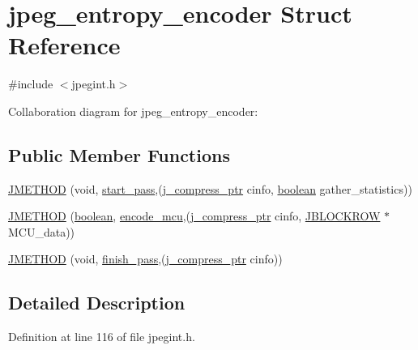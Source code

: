 \hypertarget{structjpeg__entropy__encoder}{}\section{jpeg\+\_\+entropy\+\_\+encoder Struct Reference}
\label{structjpeg__entropy__encoder}


{\ttfamily \#include $<$jpegint.\+h$>$}



Collaboration diagram for jpeg\+\_\+entropy\+\_\+encoder\+:
\subsection*{Public Member Functions}
\begin{DoxyCompactItemize}
\item 
\mbox{\hyperlink{structjpeg__entropy__encoder_aa42cc97f950746e53857b958e00519dd}{J\+M\+E\+T\+H\+OD}} (void, \mbox{\hyperlink{jddctmgr_8c_a1964f006adb8fb80f57e455f6452aec1}{start\+\_\+pass}},(\mbox{\hyperlink{jpeglib_8h_add2a072c54e3a51550f4975f7ddb91e7}{j\+\_\+compress\+\_\+ptr}} cinfo, \mbox{\hyperlink{jmorecfg_8h_a7c6368b321bd9acd0149b030bb8275ed}{boolean}} gather\+\_\+statistics))
\item 
\mbox{\hyperlink{structjpeg__entropy__encoder_a6852c01b9a63cceaae5f1d0e4ef1185a}{J\+M\+E\+T\+H\+OD}} (\mbox{\hyperlink{jmorecfg_8h_a7c6368b321bd9acd0149b030bb8275ed}{boolean}}, \mbox{\hyperlink{jcarith_8c_a72e97499e846635676b53db9977b4a5a}{encode\+\_\+mcu}},(\mbox{\hyperlink{jpeglib_8h_add2a072c54e3a51550f4975f7ddb91e7}{j\+\_\+compress\+\_\+ptr}} cinfo, \mbox{\hyperlink{jpeglib_8h_a04dea0959d9bd9e8ddad83597161453b}{J\+B\+L\+O\+C\+K\+R\+OW}} $\ast$M\+C\+U\+\_\+data))
\item 
\mbox{\hyperlink{structjpeg__entropy__encoder_a349e641fd2289448e8169b8aa8edefa5}{J\+M\+E\+T\+H\+OD}} (void, \mbox{\hyperlink{jcarith_8c_a3098c13232c4cb8675f1f35a80aa5944}{finish\+\_\+pass}},(\mbox{\hyperlink{jpeglib_8h_add2a072c54e3a51550f4975f7ddb91e7}{j\+\_\+compress\+\_\+ptr}} cinfo))
\end{DoxyCompactItemize}


\subsection{Detailed Description}


Definition at line 116 of file jpegint.\+h.



